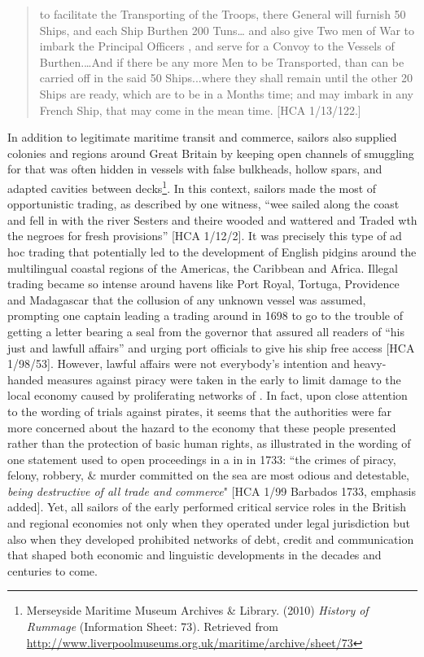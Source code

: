 \begin{quotation}
to facilitate the Transporting of the Troops, there General will furnish 50 Ships, and each Ship Burthen 200 Tuns… and also give Two men of War to imbark the Principal Officers , and serve for a Convoy to the Vessels of Burthen.…And if there be any more Men to be Transported, than can be carried off in the said 50 Ships...where they shall remain until the other 20 Ships are ready, which are to be in a Months time; and may imbark in any French Ship, that may come in the mean time. [HCA 1/13/122.]
\end{quotation}

In addition to legitimate maritime transit and commerce, sailors also supplied colonies and regions around Great Britain by keeping open channels of smuggling for  that was often hidden in vessels with false bulkheads, hollow spars, and adapted cavities between decks\footnote{Merseyside Maritime Museum Archives \& Library. (2010)  \textit{History of Rummage} (Information Sheet: 73). Retrieved from \url{http://www.liverpoolmuseums.org.uk/maritime/archive/sheet/73}}. In this context, sailors made the most of opportunistic trading, as described by one witness, “wee sailed along the coast and fell in with the river Sesters and theire wooded and wattered and Traded wth the negroes for fresh provisions” [HCA 1/12/2]. It was precisely this type of ad hoc trading that potentially led to the development of English pidgins around the multilingual coastal regions of the Americas, the Caribbean and Africa. Illegal trading became so intense around  havens like Port Royal, Tortuga, Providence and Madagascar that the collusion of any unknown vessel was assumed, prompting one captain leading a trading  around  in 1698 to go to the trouble of getting a letter bearing a seal from the governor that assured all readers of “his just and lawfull affairs” and urging port officials to give his ship free access [HCA 1/98/53]. However, lawful affairs were not everybody’s intention and heavy-handed measures against piracy were taken in the early  to limit damage to the local economy caused by proliferating networks of . In fact, upon close attention to the wording of trials against pirates, it seems that the authorities were far more concerned about the hazard to the economy that these people presented rather than the protection of basic human rights, as illustrated in the wording of one statement used to open proceedings in a  in  in 1733: “the crimes of piracy, felony, robbery, \& murder committed on the sea are most odious and detestable, \textit{being destructive of all trade and commerce}" [HCA 1/99 Barbados {1733}, emphasis added]. Yet, all sailors of the early  performed critical service roles in the British and regional economies not only when they operated under legal jurisdiction but also when they developed prohibited networks of debt, credit and communication that shaped both economic and linguistic developments in the decades and centuries to come. 

